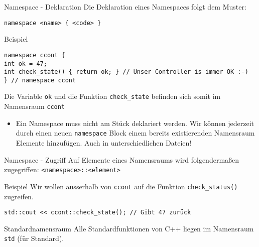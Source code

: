 \documentclass[presentation]{beamer}
\begin{document}
\begin{frame}[label={sec:org62a8f4c},fragile]{Namespace - Deklaration}
 Die Deklaration eines Namespaces folgt dem Muster:

{\color{solarizedYellow}\verb!namespace <name> { <code> }!}
\begin{block}{Beispiel}
\begin{verbatim}
namespace ccont {
int ok = 47;
int check_state() { return ok; } // Unser Controller is immer OK :-)
} // namespace ccont
\end{verbatim}
Die Variable {\color{solarizedYellow}\verb!ok!} und die Funktion {\color{solarizedYellow}\verb!check_state!} befinden sich somit
im Namensraum {\color{solarizedYellow}\verb!ccont!}
\end{block}
\begin{itemize}
\item Ein Namespace muss nicht am Stück deklariert werden. Wir können
jederzeit durch einen neuen {\color{solarizedYellow}\verb!namespace!} Block einem bereits
existierenden Namensraum \alert{Elemente hinzufügen}. Auch in
\alert{unterschiedlichen Dateien}!
\end{itemize}
\end{frame}
\begin{frame}[label={sec:orgf44c814},fragile]{Namespace - Zugriff}
 Auf Elemente eines Namensraums wird folgendermaßen zugegriffen:
{\color{solarizedYellow}\verb!<namespace>::<element>!}
\begin{block}{Beispiel}
Wir wollen ausserhalb von {\color{solarizedYellow}\verb!ccont!} auf die Funktion {\color{solarizedYellow}\verb!check_status()!}
zugreifen.
\begin{verbatim}
std::cout << ccont::check_state(); // Gibt 47 zurück
\end{verbatim}
\end{block}
\begin{block}{Standardnamensraum}
Alle Standardfunktionen von C++ liegen im Namensraum {\color{solarizedYellow}\verb!std!} (für
Standard).
\end{block}
\end{frame}
\end{document}
